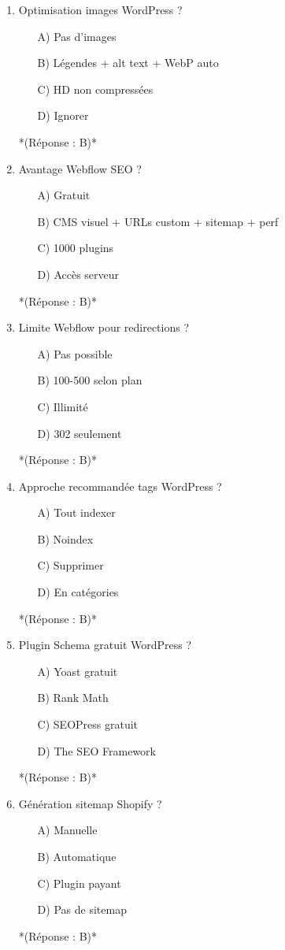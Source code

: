 \documentclass[12pt,a4paper,twoside]{report}
\begin{document}
\begin{enumerate}
\item Optimisation images WordPress ?
\begin{itemize}
\item[A)] Pas d'images
\item[B)] Légendes + alt text + WebP auto
\item[C)] HD non compressées
\item[D)] Ignorer
\end{itemize}
*(Réponse : B)*

\item Avantage Webflow SEO ?
\begin{itemize}
\item[A)] Gratuit
\item[B)] CMS visuel + URLs custom + sitemap + perf
\item[C)] 1000 plugins
\item[D)] Accès serveur
\end{itemize}
*(Réponse : B)*

\item Limite Webflow pour redirections ?
\begin{itemize}
\item[A)] Pas possible
\item[B)] 100-500 selon plan
\item[C)] Illimité
\item[D)] 302 seulement
\end{itemize}
*(Réponse : B)*

\item Approche recommandée tags WordPress ?
\begin{itemize}
\item[A)] Tout indexer
\item[B)] Noindex
\item[C)] Supprimer
\item[D)] En catégories
\end{itemize}
*(Réponse : B)*

\item Plugin Schema gratuit WordPress ?
\begin{itemize}
\item[A)] Yoast gratuit
\item[B)] Rank Math
\item[C)] SEOPress gratuit
\item[D)] The SEO Framework
\end{itemize}
*(Réponse : B)*

\item Génération sitemap Shopify ?
\begin{itemize}
\item[A)] Manuelle
\item[B)] Automatique
\item[C)] Plugin payant
\item[D)] Pas de sitemap
\end{itemize}
*(Réponse : B)*


\end{enumerate}
\end{document}

